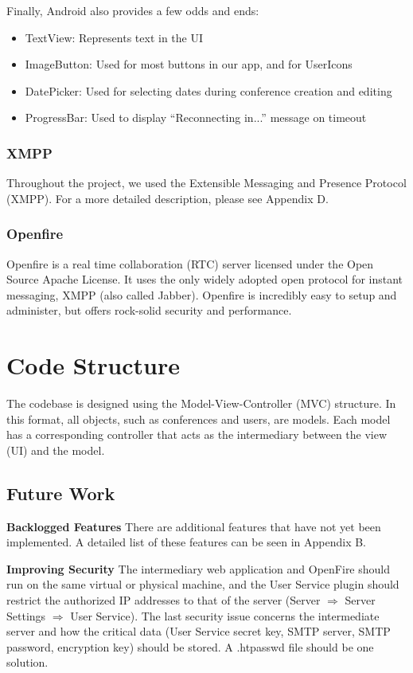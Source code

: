 \documentclass[12pt, letterpaper]{article}
\begin{document}
Finally, Android also provides a few odds and ends:
\begin{itemize}
\item TextView: Represents text in the UI
\item ImageButton: Used for most buttons in our app, and for UserIcons
\item DatePicker: Used for selecting dates during conference creation and editing
\item ProgressBar: Used to display “Reconnecting in...” message on timeout
\end{itemize}

\subsubsection{XMPP}
Throughout the project, we used the Extensible Messaging and Presence Protocol (XMPP). For a more detailed description, please see Appendix D.

\subsubsection{Openfire}
Openfire is a real time collaboration (RTC) server licensed under the Open Source Apache License. It uses the only widely adopted open protocol for instant messaging, XMPP (also called Jabber). Openfire is incredibly easy to setup and administer, but offers rock-solid security and performance.

\section{Code Structure}

The codebase is designed using the Model-View-Controller (MVC) structure.  In this format, all objects, such as conferences and users, are models.  Each model has a corresponding controller that acts as the intermediary between the view (UI) and the model.

\subsection{Future Work}
\textbf{Backlogged Features} There are additional features that have not yet been implemented.  A detailed list of these features can be seen in Appendix B.  

\textbf{Improving Security} The intermediary web application and OpenFire should run on the same virtual or physical machine, and the User Service plugin should restrict the authorized IP addresses to that of the server (Server $\Rightarrow$ Server Settings $\Rightarrow$ User Service). The last security issue concerns the intermediate server and how the critical data (User Service secret key, SMTP server, SMTP password, encryption key) should be stored. A .htpasswd file should be one solution.
\end{document}

